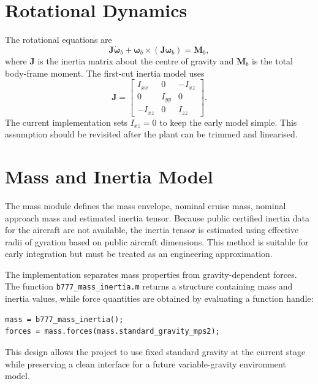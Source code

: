 \section{Rotational Dynamics}

The rotational equations are
\begin{equation}
    \bm{J}\dot{\bm{\omega}}_b +
    \bm{\omega}_b \times \left(\bm{J}\bm{\omega}_b\right) =
    \bm{M}_b,
\end{equation}
where $\bm{J}$ is the inertia matrix about the centre of gravity and $\bm{M}_b$ is the total body-frame moment. The first-cut inertia model uses
\begin{equation}
    \bm{J} =
    \begin{bmatrix}
        I_{xx} & 0 & -I_{xz} \\
        0 & I_{yy} & 0 \\
        -I_{xz} & 0 & I_{zz}
    \end{bmatrix}.
\end{equation}
The current implementation sets $I_{xz}=0$ to keep the early model simple. This assumption should be revisited after the plant can be trimmed and linearised.

\section{Mass and Inertia Model}

The mass module defines the mass envelope, nominal cruise mass, nominal approach mass and estimated inertia tensor. Because public certified inertia data for the aircraft are not available, the inertia tensor is estimated using effective radii of gyration based on public aircraft dimensions. This method is suitable for early integration but must be treated as an engineering approximation.

The implementation separates mass properties from gravity-dependent forces. The function \texttt{b777\_mass\_inertia.m} returns a structure containing mass and inertia values, while force quantities are obtained by evaluating a function handle:
\begin{lstlisting}[caption={Current gravity-dependent mass force interface.}]
mass = b777_mass_inertia();
forces = mass.forces(mass.standard_gravity_mps2);
\end{lstlisting}
This design allows the project to use fixed standard gravity at the current stage while preserving a clean interface for a future variable-gravity environment model.

